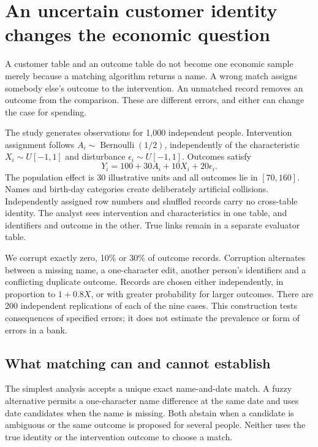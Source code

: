 \chapter{An uncertain customer identity changes the economic question}
\label{gap29:observation}
A customer table and an outcome table do not become one economic sample merely
because a matching algorithm returns a name. A wrong match assigns somebody
else's outcome to the intervention. An unmatched record removes an outcome
from the comparison. These are different errors, and either can change the
case for spending.

The study generates observations for 1,000 independent people. Intervention
assignment follows $A_i\sim\operatorname{Bernoulli}(1/2)$, independently of
the characteristic $X_i\sim U[-1,1]$ and disturbance
$\epsilon_i\sim U[-1,1]$. Outcomes satisfy
\[
 Y_i=100+30A_i+10X_i+20\epsilon_i.
\]
The population effect is 30 illustrative units and all outcomes lie in
$[70,160]$. Names and birth-day categories create deliberately artificial
collisions. Independently assigned row numbers and shuffled records carry
no cross-table identity. The analyst sees intervention and characteristics
in one table, and identifiers and outcome in the other. True links remain
in a separate evaluator table.

We corrupt exactly zero, 10\% or 30\% of outcome records. Corruption alternates
between a missing name, a one-character edit, another person's identifiers
and a conflicting duplicate outcome. Records are chosen either independently,
in proportion to $1+0.8X$, or with greater probability for larger outcomes.
There are 200 independent replications of each of the nine cases.
This construction tests consequences of specified errors; it does not
estimate the prevalence or form of errors in a bank.

\section{What matching can and cannot establish}
The simplest analysis accepts a unique exact name-and-date match. A fuzzy
alternative permits a one-character name difference at the same date and
uses date candidates when the name is missing. Both abstain when a candidate
is ambiguous or the same outcome is proposed for several people. Neither
uses the true identity or the intervention outcome to choose a match.

